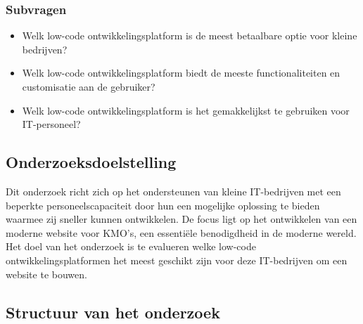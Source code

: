 \subsubsection{Subvragen}
\label{sec:Subvragen}
\begin{itemize}
  \item Welk low-code ontwikkelingsplatform is de meest betaalbare optie voor kleine bedrijven?
  \item Welk low-code ontwikkelingsplatform biedt de meeste functionaliteiten en customisatie aan de gebruiker?
  \item Welk low-code ontwikkelingsplatform is het gemakkelijkst te gebruiken voor \\IT-personeel?
\end{itemize}
 
\subsection{Onderzoeksdoelstelling}
\label{sec:Onderzoeksdoel}

Dit onderzoek richt zich op het ondersteunen van kleine IT-bedrijven met een beperkte personeelscapaciteit door hun een mogelijke oplossing te bieden waarmee zij sneller kunnen ontwikkelen. De focus ligt op het ontwikkelen van een moderne website voor KMO’s, een essentiële benodigdheid in de moderne wereld. Het doel van het onderzoek is te evalueren welke low-code ontwikkelingsplatformen het meest geschikt zijn voor deze IT-bedrijven om een website te bouwen.

\subsection{Structuur van het onderzoek}
\label{sec:Structuur van het onderzoek}

